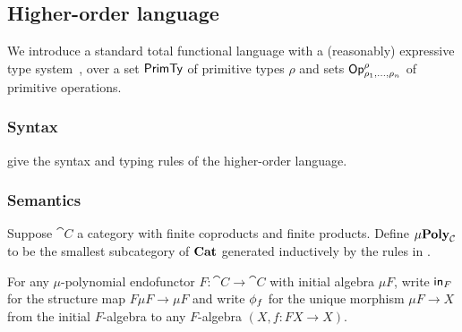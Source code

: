 \subsection{Higher-order language}

We introduce a standard total functional language with a (reasonably) expressive type
system~\cite{crole94,pitts01,santocanale02}, over a set $\mathsf{PrimTy}$ of primitive types $\rho$ and sets
$\mathsf{Op}^\rho_{\rho_1,\ldots,\rho_n}$ of primitive operations.

\subsubsection{Syntax}
\label{sec:language:syntax}





 give the syntax and typing rules of the higher-order language.

\subsubsection{Semantics}
\label{sec:language:semantics}




\begin{definition}[$\mu$-polynomial]
Suppose $\cat{C}$ a category with finite coproducts and finite products. Define $\mu\mathbf{Poly}_{\mathcal{C}}$ to be the
smallest subcategory of $\mathbf{Cat}$ generated inductively by the rules in .
\end{definition}

For any $\mu$-polynomial endofunctor $F: \cat{C} \to \cat{C}$ with initial algebra $\mu F$, write $\mathsf{in}_F$
for the structure map $F\mu F \to \mu F$ and write $\phi_f$ for the unique morphism $\mu F \to X$ from the
initial $F$-algebra to any $F$-algebra $(X, f: FX \to X)$.

